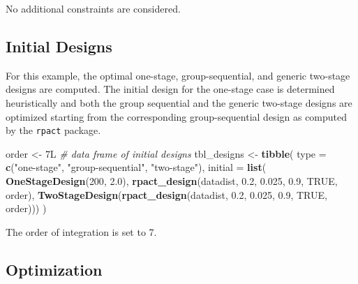 \documentclass[
]{book}
\newenvironment{Shaded}{\begin{snugshade}}{\end{snugshade}}
\newcommand{\CommentTok}[1]{\textcolor[rgb]{0.56,0.35,0.01}{\textit{#1}}}
\newcommand{\DataTypeTok}[1]{\textcolor[rgb]{0.13,0.29,0.53}{#1}}
\newcommand{\DecValTok}[1]{\textcolor[rgb]{0.00,0.00,0.81}{#1}}
\newcommand{\FloatTok}[1]{\textcolor[rgb]{0.00,0.00,0.81}{#1}}
\newcommand{\KeywordTok}[1]{\textcolor[rgb]{0.13,0.29,0.53}{\textbf{#1}}}
\newcommand{\NormalTok}[1]{#1}
\newcommand{\OperatorTok}[1]{\textcolor[rgb]{0.81,0.36,0.00}{\textbf{#1}}}
\newcommand{\OtherTok}[1]{\textcolor[rgb]{0.56,0.35,0.01}{#1}}
\newcommand{\StringTok}[1]{\textcolor[rgb]{0.31,0.60,0.02}{#1}}
\begin{document}
No additional constraints are considered.

\hypertarget{initial-designs-1}{%
\subsection{Initial Designs}\label{initial-designs-1}}

For this example, the optimal one-stage, group-sequential, and generic
two-stage designs are computed.
The initial design for the one-stage case is determined heuristically
and both the group sequential and the generic two-stage designs are
optimized starting from the corresponding group-sequential design as
computed by the \texttt{rpact} package.

\begin{Shaded}
\begin{Highlighting}[]
\NormalTok{order <-}\StringTok{ }\NormalTok{7L}
\CommentTok{# data frame of initial designs }
\NormalTok{tbl_designs <-}\StringTok{ }\KeywordTok{tibble}\NormalTok{(}
    \DataTypeTok{type    =} \KeywordTok{c}\NormalTok{(}\StringTok{"one-stage"}\NormalTok{, }\StringTok{"group-sequential"}\NormalTok{, }\StringTok{"two-stage"}\NormalTok{),}
    \DataTypeTok{initial =} \KeywordTok{list}\NormalTok{(}
        \KeywordTok{OneStageDesign}\NormalTok{(}\DecValTok{200}\NormalTok{, }\FloatTok{2.0}\NormalTok{),}
        \KeywordTok{rpact_design}\NormalTok{(datadist, }\FloatTok{0.2}\NormalTok{, }\FloatTok{0.025}\NormalTok{, }\FloatTok{0.9}\NormalTok{, }\OtherTok{TRUE}\NormalTok{, order),}
        \KeywordTok{TwoStageDesign}\NormalTok{(}\KeywordTok{rpact_design}\NormalTok{(datadist, }\FloatTok{0.2}\NormalTok{, }\FloatTok{0.025}\NormalTok{, }\FloatTok{0.9}\NormalTok{, }\OtherTok{TRUE}\NormalTok{, order))) )}
\end{Highlighting}
\end{Shaded}

The order of integration is set to 7.

\hypertarget{optimization-13}{%
\subsection{Optimization}\label{optimization-13}}

\begin{Shaded}
\end{Shaded}
\end{document}
